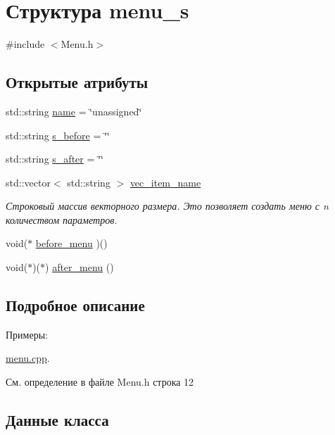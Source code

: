 \hypertarget{structmenu__s}{}\section{Структура menu\+\_\+s}
\label{structmenu__s}


{\ttfamily \#include $<$Menu.\+h$>$}

\subsection*{Открытые атрибуты}
\begin{DoxyCompactItemize}
\item 
std\+::string \hyperlink{structmenu__s_a2b4d6cd699b46daba2bb8297c11971aa}{name} = \char`\"{}unassigned\char`\"{}
\item 
std\+::string \hyperlink{structmenu__s_ad653d55a31d8503ad989ffd0b94c14e4}{s\+\_\+before} = \char`\"{}\char`\"{}
\item 
std\+::string \hyperlink{structmenu__s_a8622e3ccae9b1356ad3e2e3eb51a44e8}{s\+\_\+after} = \char`\"{}\char`\"{}
\item 
std\+::vector$<$ std\+::string $>$ \hyperlink{structmenu__s_abf8d2985fb3bf50d8e2075701149375a}{vec\+\_\+item\+\_\+name}
\begin{DoxyCompactList}\small\item\em Строковый массив векторного размера. Это позволяет создать меню с n количеством параметров. \end{DoxyCompactList}\item 
void($\ast$ \hyperlink{structmenu__s_a856a04d9c6a20c33b0a763149aa021fc}{before\+\_\+menu} )()
\item 
void($\ast$)($\ast$) \hyperlink{structmenu__s_a18bd030b9a460fbfaa350413f8aa0340}{after\+\_\+menu} ()
\end{DoxyCompactItemize}


\subsection{Подробное описание}
\begin{Desc}
\item[Примеры\+: ]\par
\hyperlink{menu_8cpp-example}{menu.\+cpp}.\end{Desc}


См. определение в файле Menu.\+h строка 12



\subsection{Данные класса}
\mbox{\label{structmenu__s_a18bd030b9a460fbfaa350413f8aa0340}} 
